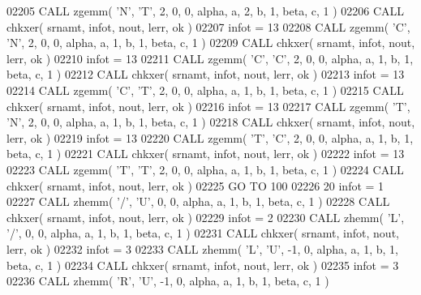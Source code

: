 \begin{DoxyCode}
02205       \textcolor{keyword}{CALL }zgemm( \textcolor{stringliteral}{'N'}, \textcolor{stringliteral}{'T'}, 2, 0, 0, alpha, a, 2, b, 1, beta, c, 1 )
02206       \textcolor{keyword}{CALL }chkxer( srnamt, infot, nout, lerr, ok )
02207       infot = 13
02208       \textcolor{keyword}{CALL }zgemm( \textcolor{stringliteral}{'C'}, \textcolor{stringliteral}{'N'}, 2, 0, 0, alpha, a, 1, b, 1, beta, c, 1 )
02209       \textcolor{keyword}{CALL }chkxer( srnamt, infot, nout, lerr, ok )
02210       infot = 13
02211       \textcolor{keyword}{CALL }zgemm( \textcolor{stringliteral}{'C'}, \textcolor{stringliteral}{'C'}, 2, 0, 0, alpha, a, 1, b, 1, beta, c, 1 )
02212       \textcolor{keyword}{CALL }chkxer( srnamt, infot, nout, lerr, ok )
02213       infot = 13
02214       \textcolor{keyword}{CALL }zgemm( \textcolor{stringliteral}{'C'}, \textcolor{stringliteral}{'T'}, 2, 0, 0, alpha, a, 1, b, 1, beta, c, 1 )
02215       \textcolor{keyword}{CALL }chkxer( srnamt, infot, nout, lerr, ok )
02216       infot = 13
02217       \textcolor{keyword}{CALL }zgemm( \textcolor{stringliteral}{'T'}, \textcolor{stringliteral}{'N'}, 2, 0, 0, alpha, a, 1, b, 1, beta, c, 1 )
02218       \textcolor{keyword}{CALL }chkxer( srnamt, infot, nout, lerr, ok )
02219       infot = 13
02220       \textcolor{keyword}{CALL }zgemm( \textcolor{stringliteral}{'T'}, \textcolor{stringliteral}{'C'}, 2, 0, 0, alpha, a, 1, b, 1, beta, c, 1 )
02221       \textcolor{keyword}{CALL }chkxer( srnamt, infot, nout, lerr, ok )
02222       infot = 13
02223       \textcolor{keyword}{CALL }zgemm( \textcolor{stringliteral}{'T'}, \textcolor{stringliteral}{'T'}, 2, 0, 0, alpha, a, 1, b, 1, beta, c, 1 )
02224       \textcolor{keyword}{CALL }chkxer( srnamt, infot, nout, lerr, ok )
02225       \textcolor{keywordflow}{GO TO} 100
02226    20 infot = 1
02227       \textcolor{keyword}{CALL }zhemm( \textcolor{stringliteral}{'/'}, \textcolor{stringliteral}{'U'}, 0, 0, alpha, a, 1, b, 1, beta, c, 1 )
02228       \textcolor{keyword}{CALL }chkxer( srnamt, infot, nout, lerr, ok )
02229       infot = 2
02230       \textcolor{keyword}{CALL }zhemm( \textcolor{stringliteral}{'L'}, \textcolor{stringliteral}{'/'}, 0, 0, alpha, a, 1, b, 1, beta, c, 1 )
02231       \textcolor{keyword}{CALL }chkxer( srnamt, infot, nout, lerr, ok )
02232       infot = 3
02233       \textcolor{keyword}{CALL }zhemm( \textcolor{stringliteral}{'L'}, \textcolor{stringliteral}{'U'}, -1, 0, alpha, a, 1, b, 1, beta, c, 1 )
02234       \textcolor{keyword}{CALL }chkxer( srnamt, infot, nout, lerr, ok )
02235       infot = 3
02236       \textcolor{keyword}{CALL }zhemm( \textcolor{stringliteral}{'R'}, \textcolor{stringliteral}{'U'}, -1, 0, alpha, a, 1, b, 1, beta, c, 1 )

\end{DoxyCode}
